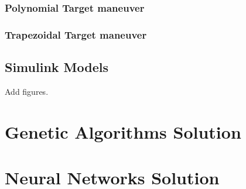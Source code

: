 \subsubsection{Polynomial Target maneuver}


\subsubsection{Trapezoidal Target maneuver}


\subsection{Simulink Models}

Add figures.

\section{Genetic Algorithms Solution}

\section{Neural Networks Solution}
